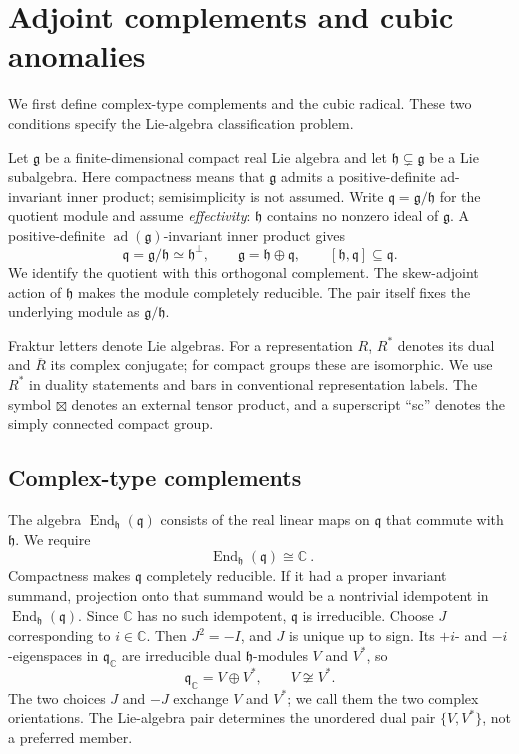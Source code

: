 \documentclass[11pt]{article}
\theoremstyle{remark}
\newcommand{\g}{\mathfrak g}
\newcommand{\h}{\mathfrak h}
\newcommand{\q}{\mathfrak q}
\begin{document}
\section{Adjoint complements and cubic anomalies}

We first define complex-type complements and the cubic radical. These two
conditions specify the Lie-algebra classification problem.

Let \(\g\) be a finite-dimensional compact real Lie algebra and let
\(\h\subsetneq\g\) be a Lie subalgebra. Here compactness means that
\(\g\) admits a positive-definite ad-invariant inner product;
semisimplicity is not assumed. Write
\(\q=\g/\h\) for the quotient module and assume
\emph{effectivity}: \(\h\) contains no nonzero ideal of \(\g\). A
positive-definite \(\operatorname{ad}(\g)\)-invariant inner product gives
\[
 \q=\g/\h\simeq\h^\perp,
 \qquad \g=\h\oplus\q,
 \qquad [\h,\q]\subseteq\q.
\]
We identify the quotient with this orthogonal complement. The skew-adjoint
action of \(\h\) makes the module completely reducible. The pair
itself fixes the underlying module as \(\g/\h\).

Fraktur letters denote Lie algebras. For a representation \(R\),
\(R^*\) denotes its dual and \(\overline R\) its complex conjugate; for
compact groups these are isomorphic. We use \(R^*\) in duality statements
and bars in conventional representation labels. The symbol \(\boxtimes\)
denotes an external tensor product, and a superscript ``sc'' denotes the
simply connected compact group.

\subsection{Complex-type complements}

The algebra \(\operatorname{End}_{\h}(\q)\) consists of the real linear
maps on \(\q\) that commute with \(\h\). We require
\[
 \boxed{\ \operatorname{End}_{\h}(\q)\cong\mathbb C\ }. \tag{1}
\]
Compactness makes \(\q\) completely reducible. If it had a proper
invariant summand, projection onto that summand would be a nontrivial
idempotent in \(\operatorname{End}_{\h}(\q)\). Since \(\mathbb C\) has
no such idempotent, \(\q\) is irreducible. Choose \(J\) corresponding to
\(i\in\mathbb C\). Then \(J^2=-I\), and \(J\) is unique up to sign. Its
\(+i\)- and \(-i\)-eigenspaces in \(\q_{\mathbb C}\) are irreducible
dual \(\h\)-modules \(V\) and \(V^*\), so
\[
 \q_{\mathbb C}=V\oplus V^*,\qquad V\not\cong V^*.
\]
The two choices \(J\) and \(-J\) exchange \(V\) and \(V^*\); we call them
the two complex orientations. The Lie-algebra pair determines the unordered
dual pair \(\{V,V^*\}\), not a preferred member.
\end{document}
